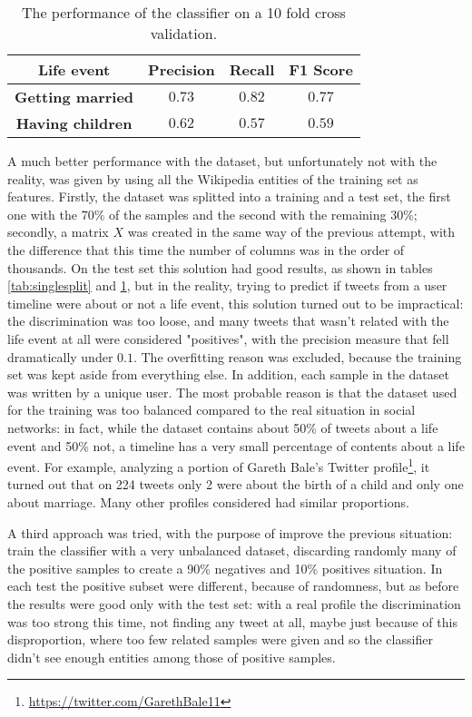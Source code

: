 \begin{table}
\begin{center}
\begin{tabular}{cccc}
\hline
Life event & Precision & Recall & F1 Score \\
\hline
\textbf{Getting married} & $0.73$ & $0.82$ & $0.77$ \\
\textbf{Having children} & $0.62$ & $0.57$ & $0.59$ \\
\hline
\end{tabular}
\end{center}
\caption{The performance of the classifier on a 10 fold cross validation.}
\label{tab:kfold}
\end{table}

A much better performance with the dataset, but unfortunately not with the reality, was given by using all the Wikipedia entities of the training set as features. Firstly, the dataset was splitted into a training and a test set, the first one with the 70\% of the samples and the second with the remaining 30\%; secondly, a matrix $X$ was created in the same way of the previous attempt, with the difference that this time the number of columns was in the order of thousands. On the test set this solution had good results, as shown in tables \ref{tab:singlesplit} and \ref{tab:kfold}, but in the reality, trying to predict if tweets from a user timeline were about or not a life event, this solution turned out to be impractical: the discrimination was too loose, and many tweets that wasn't related with the life event at all were considered "positives", with the precision measure that fell dramatically under $0.1$. The overfitting reason was excluded, because the training set was kept aside from everything else. In addition, each sample in the dataset was written by a unique user. The most probable reason is that the dataset used for the training was too balanced compared to the real situation in social networks: in fact, while the dataset contains about 50\% of tweets about a life event and 50\% not, a timeline has a very small percentage of contents about a life event. For example, analyzing a portion of Gareth Bale's Twitter profile\footnote{\url{https://twitter.com/GarethBale11}}, it turned out that on 224 tweets only 2 were about the birth of a child and only one about marriage. Many other profiles considered had similar proportions. 

A third approach was tried, with the purpose of improve the previous situation: train the classifier with a very unbalanced dataset, discarding randomly many of the positive samples to create a 90\% negatives and 10\% positives situation. In each test the positive subset were different, because of randomness, but as before the results were good only with the test set: with a real profile the discrimination was too strong this time, not finding any tweet at all, maybe just because of this disproportion, where too few related samples were given and so the classifier didn't see enough entities among those of positive samples.